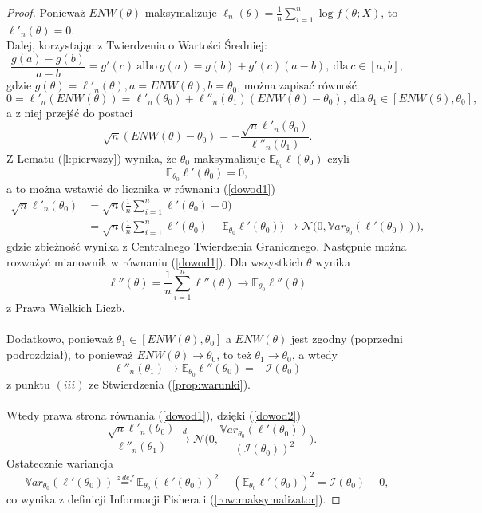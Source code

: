 \begin{proof}
Ponieważ $ENW(\theta)$ maksymalizuje $\ell_n(\theta) = \frac{1}{n}\sum\limits_{i=1}^{n}\log f(\theta;X)$, to $\ell'_n(\theta)=0$. \\ Dalej, korzystając z Twierdzenia o Wartości Średniej:
$$\dfrac{g(a)-g(b)}{a-b} = g'(c) \ \text{albo} \ g(a)=g(b)+g'(c)(a-b), \ \text{dla} \ c \in [a,b],$$
gdzie $g(\theta) = \ell'_n(\theta), a = ENW(\theta), b = \theta_0$, można zapisać równość
$$ 0 = \ell'_n(ENW(\theta)) = \ell'_n(\theta_0) + \ell''_n(\theta_1)(ENW(\theta)-\theta_0), \ \text{dla} \ \theta_1 \in [ENW(\theta),\theta_0],$$ 
a z niej przejść do postaci 
\begin{equation}\label{dowod1}
\sqrt{n}(ENW(\theta)-\theta_0) = - \dfrac{\sqrt{n}\ell'_n(\theta_0)}{\ell''_n(\theta_1)}.
\end{equation}
Z Lematu (\ref{l:pierwszy}) wynika, że $\theta_0$ maksymalizuje $\mathbb{E}_{\theta_0}\ell(\theta_0)$ czyli
\begin{equation}\label{row:maksymalizator}
\mathbb{E}_{\theta_0}\ell'(\theta_0) = 0,
\end{equation}
a to można wstawić do licznika w równaniu (\ref{dowod1})
\begin{equation}\label{dowod2}
\begin{split}
\sqrt{n}\ell'_n(\theta_0) & = \sqrt{n}\Big(\frac{1}{n}\sum\limits_{i=1}^{n}\ell'(\theta_0) - 0\Big) \\
& = \sqrt{n}\Big(\frac{1}{n}\sum\limits_{i=1}^{n}\ell'(\theta_0) - \mathbb{E}_{\theta_0}\ell'(\theta_0)\Big) \rightarrow \mathcal{N}\Big(0, \mathbb{V}ar_{\theta_0}(\ell'(\theta_0))\Big),
\end{split}
\end{equation}
gdzie zbieżność wynika z Centralnego Twierdzenia Granicznego. 
\newpage
Następnie można rozważyć mianownik w równaniu (\ref{dowod1}). Dla wszystkich $\theta$ wynika
$$\ell''(\theta) = \frac{1}{n}\sum\limits_{i=1}^{n}\ell''(\theta) \rightarrow \mathbb{E}_{\theta_0}\ell''(\theta)$$
z Prawa Wielkich Liczb. \\ \ \\ Dodatkowo, ponieważ $\theta_1 \in [ENW(\theta),\theta_0]$ a $ENW(\theta)$ jest zgodny (poprzedni podrozdział), to ponieważ $ENW(\theta) \rightarrow \theta_0$, to też $\theta_1 \rightarrow \theta_0$, a wtedy
$$\ell''_n(\theta_1) \rightarrow \mathbb{E}_{\theta_0}\ell''(\theta_0) = -\mathcal{I}(\theta_0)$$
z punktu $(iii)$ ze Stwierdzenia (\ref{prop:warunki}).\\ \ \\ Wtedy prawa strona równania (\ref{dowod1}), dzięki (\ref{dowod2})
$$- \dfrac{\sqrt{n}\ell'_n(\theta_0)}{\ell''_n(\theta_1)} \overset{d}{\rightarrow} \mathcal{N}\Big(0,\dfrac{\mathbb{V}ar_{\theta_0}(\ell'(\theta_0))}{(\mathcal{I}(\theta_0))^2} \Big).$$
Ostatecznie wariancja
$$\mathbb{V}ar_{\theta_0}(\ell'(\theta_0)) \overset{z \ def}{=} \mathbb{E}_{\theta_0}(\ell'(\theta_0))^2 - (\mathbb{E}_{\theta_0}\ell'(\theta_0))^2 = \mathcal{I}(\theta_0) - 0,$$
co wynika z definicji Informacji Fishera i (\ref{row:maksymalizator}).

\end{proof}
